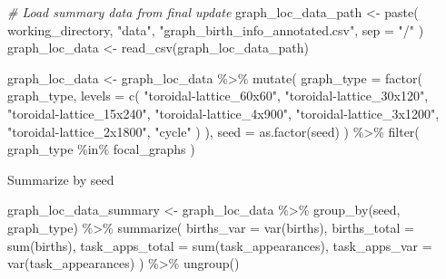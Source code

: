 \documentclass[
]{book}
\newenvironment{Shaded}{\begin{snugshade}}{\end{snugshade}}
\newcommand{\AttributeTok}[1]{\textcolor[rgb]{0.77,0.63,0.00}{#1}}
\newcommand{\CommentTok}[1]{\textcolor[rgb]{0.56,0.35,0.01}{\textit{#1}}}
\newcommand{\FunctionTok}[1]{\textcolor[rgb]{0.00,0.00,0.00}{#1}}
\newcommand{\NormalTok}[1]{#1}
\newcommand{\OtherTok}[1]{\textcolor[rgb]{0.56,0.35,0.01}{#1}}
\newcommand{\SpecialCharTok}[1]{\textcolor[rgb]{0.00,0.00,0.00}{#1}}
\newcommand{\StringTok}[1]{\textcolor[rgb]{0.31,0.60,0.02}{#1}}
\begin{document}
\begin{Shaded}
\begin{Highlighting}[]
\CommentTok{\# Load summary data from final update}
\NormalTok{graph\_loc\_data\_path }\OtherTok{\textless{}{-}} \FunctionTok{paste}\NormalTok{(}
\NormalTok{  working\_directory,}
  \StringTok{"data"}\NormalTok{,}
  \StringTok{"graph\_birth\_info\_annotated.csv"}\NormalTok{,}
  \AttributeTok{sep =} \StringTok{"/"}
\NormalTok{)}
\NormalTok{graph\_loc\_data }\OtherTok{\textless{}{-}} \FunctionTok{read\_csv}\NormalTok{(graph\_loc\_data\_path)}

\NormalTok{graph\_loc\_data }\OtherTok{\textless{}{-}}\NormalTok{ graph\_loc\_data }\SpecialCharTok{\%\textgreater{}\%}
  \FunctionTok{mutate}\NormalTok{(}
    \AttributeTok{graph\_type =} \FunctionTok{factor}\NormalTok{(}
\NormalTok{      graph\_type,}
      \AttributeTok{levels =} \FunctionTok{c}\NormalTok{(}
        \StringTok{"toroidal{-}lattice\_60x60"}\NormalTok{,}
        \StringTok{"toroidal{-}lattice\_30x120"}\NormalTok{,}
        \StringTok{"toroidal{-}lattice\_15x240"}\NormalTok{,}
        \StringTok{"toroidal{-}lattice\_4x900"}\NormalTok{,}
        \StringTok{"toroidal{-}lattice\_3x1200"}\NormalTok{,}
        \StringTok{"toroidal{-}lattice\_2x1800"}\NormalTok{,}
        \StringTok{"cycle"}
\NormalTok{      )}
\NormalTok{    ),}
    \AttributeTok{seed =} \FunctionTok{as.factor}\NormalTok{(seed)}
\NormalTok{  ) }\SpecialCharTok{\%\textgreater{}\%}
  \FunctionTok{filter}\NormalTok{(}
\NormalTok{    graph\_type }\SpecialCharTok{\%in\%}\NormalTok{ focal\_graphs}
\NormalTok{  )}
\end{Highlighting}
\end{Shaded}

Summarize by seed

\begin{Shaded}
\begin{Highlighting}[]
\NormalTok{graph\_loc\_data\_summary }\OtherTok{\textless{}{-}}\NormalTok{ graph\_loc\_data }\SpecialCharTok{\%\textgreater{}\%}
  \FunctionTok{group\_by}\NormalTok{(seed, graph\_type) }\SpecialCharTok{\%\textgreater{}\%}
  \FunctionTok{summarize}\NormalTok{(}
    \AttributeTok{births\_var =} \FunctionTok{var}\NormalTok{(births),}
    \AttributeTok{births\_total =} \FunctionTok{sum}\NormalTok{(births),}
    \AttributeTok{task\_apps\_total =} \FunctionTok{sum}\NormalTok{(task\_appearances),}
    \AttributeTok{task\_apps\_var =} \FunctionTok{var}\NormalTok{(task\_appearances)}
\NormalTok{  ) }\SpecialCharTok{\%\textgreater{}\%}
  \FunctionTok{ungroup}\NormalTok{()}
\end{Highlighting}
\end{Shaded}
\end{document}
